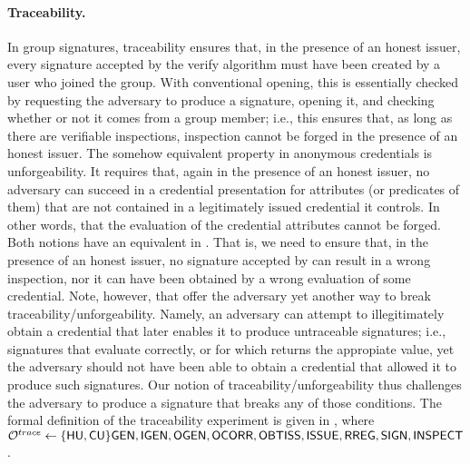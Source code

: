 \paragraph{Traceability.} %

In group signatures, traceability ensures that, in the presence of an honest
issuer, every signature accepted by the verify algorithm must have been created
by a user who joined the group.  With conventional opening, this is essentially
checked by requesting the adversary to produce a signature, opening it, and
checking whether or not it comes from a group member; i.e., this ensures that,
as long as there are verifiable inspections, inspection cannot be forged in the
presence of an honest issuer.
%
The somehow equivalent property in anonymous credentials is unforgeability. It
requires that, again in the presence of an honest issuer, no adversary can
succeed in a credential presentation for attributes (or predicates of them) that
are not contained in a legitimately issued credential it controls. In other
words, that the evaluation of the credential attributes cannot be forged.
%
Both notions have an equivalent in \UAS. That is, we need to ensure that, in the
presence of an honest issuer, no signature accepted by \Verify can result in a
wrong inspection, nor it can have been obtained by a wrong evaluation of some
credential. Note, however, that \UAS offer the adversary yet another way to
break traceability/unforgeability. Namely, an adversary can attempt to
illegitimately obtain a credential that later enables it to produce untraceable
signatures; i.e., signatures that evaluate correctly, or for which \Inspect
returns the appropiate value, yet the adversary should not have been able to
obtain a credential that allowed it to produce such signatures. Our notion of
traceability/unforgeability thus challenges the adversary to produce a signature
that breaks any of those conditions. The formal
definition of the traceability experiment is given in ,
where $\mathcal{O}^{trace} \gets \lbrace\mathsf{HU},\mathsf{CU}\rbrace\mathsf{GEN},\mathsf{IGEN},\mathsf{OGEN},\mathsf{OCORR},\mathsf{OBTISS},
\mathsf{ISSUE},\mathsf{RREG},\mathsf{SIGN},\mathsf{INSPECT}$.

